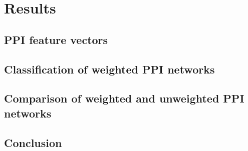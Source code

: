 \chapter{Results}
\label{results}

\lipsum[25]

\section{PPI feature vectors}

\lipsum[10-24]




\section{Classification of weighted PPI networks}

\lipsum[30-40]


\section{Comparison of weighted and unweighted PPI networks}

\lipsum[5-15]

\section*{Conclusion}

\lipsum[1]
